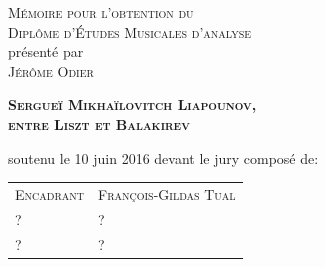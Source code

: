 \begin{titlepage}
\begin{bigcenter}

\vspace*{3.5cm}


\textsc{\Large Mémoire pour l'obtention du}\\[0.2cm]
\textsc{\Large Diplôme d'Études Musicales d'analyse}\\[0.2cm]
{présenté par}\\[0.2cm]
\textsc{\LARGE Jérôme Odier}


\vspace{3.5cm}


\textsc{\huge \bfseries Sergueï Mikhaïlovitch Liapounov,}\\
\textsc{\huge \bfseries entre Liszt et Balakirev}


\vspace{3.5cm}


{soutenu le 10 juin 2016 devant le jury composé de:}\\[0.35cm]

\begin{tabular}{ll}
  \textsc{Encadrant} & \textsc{François-Gildas Tual} \\
  \textsc{?} & \textsc{?} \\
  \textsc{?} & \textsc{?} \\
\end{tabular}


\end{bigcenter}

\end{titlepage}

\ClearShipoutPicture
